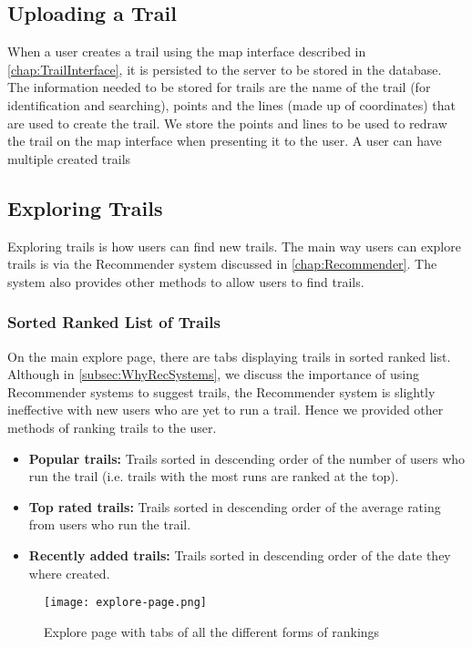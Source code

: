 \subsection{Uploading a Trail}
When a user creates a trail using the map interface described in \autoref{chap:TrailInterface}, it is persisted to the server to be stored in the database. The information needed to be stored for trails are the name of the trail (for identification and searching), points and the lines (made up of coordinates) that are used to create the trail. We store the points and lines to be used to redraw the trail on the map interface when presenting it to the user. A user can have multiple created trails

\subsection{Exploring Trails}
Exploring trails is how users can find new trails. The main way users can explore trails is via the Recommender system discussed in \autoref{chap:Recommender}. The system also provides other methods to allow users to find trails.

\subsubsection{Sorted Ranked List of Trails}
On the main explore page, there are tabs displaying trails in sorted ranked list. Although in \autoref{subsec:WhyRecSystems}, we discuss the importance of using Recommender systems to suggest trails, the Recommender system is slightly ineffective with new users who are yet to run a trail. Hence we provided other methods of ranking trails to the user.

\begin{itemize}
    \item \textbf{Popular trails:} Trails sorted in descending order of the number of users who run the trail (i.e. trails with the most runs are ranked at the top). 
    \item \textbf{Top rated trails:} Trails sorted in descending order of the average rating from users who run the trail.
    \item \textbf{Recently added trails:} Trails sorted in descending order of the date they where created.
\end{itemize}

\begin{figure}[htb!]
    \centering
    \texttt{[image: explore-page.png]}
    \caption{Explore page with tabs of all the different forms of rankings}
    \label{fig:explorePage}
\end{figure}

